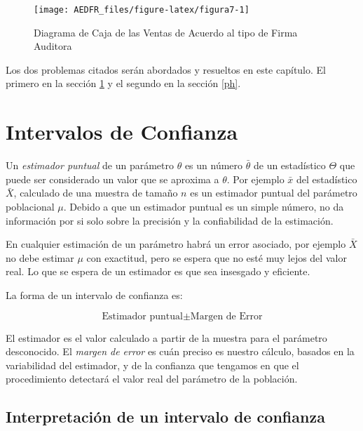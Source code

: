 \documentclass[letterpaper,]{book}
\begin{document}
\begin{figure}[h!]

{\centering \texttt{[image: AEDFR\_files/figure-latex/figura7-1]} 

}

\caption{Diagrama de Caja de las Ventas de Acuerdo al tipo de Firma Auditora}\label{fig:figura7}
\end{figure}

Los dos problemas citados serán abordados y resueltos en este capítulo. El primero en la sección \ref{ic} y el segundo en la sección \ref{ph}.

\hypertarget{ic}{%
\section{Intervalos de Confianza}\label{ic}}

Un \emph{estimador puntual} de un parámetro \(\theta\) es un número \(\bar{\theta}\) de un estadístico \(\Theta\) que puede ser considerado un valor que se aproxima a \(\theta\). Por ejemplo \(\bar{x}\) del estadístico \(\bar{X}\), calculado de una muestra de tamaño \(n\) es un estimador puntual del parámetro poblacional \(\mu\). Debido a que un estimador puntual es un simple número, no da información por si solo sobre la precisión y la confiabilidad de la estimación.

En cualquier estimación de un parámetro habrá un error asociado, por ejemplo \(\bar{X}\) no debe estimar \(\mu\) con exactitud, pero se espera que no esté muy lejos del valor real. Lo que se espera de un estimador es que sea insesgado y eficiente.

La forma de un intervalo de confianza es:

\begin{equation} 
  \text{Estimador puntual} \pm \text{Margen de Error}
  \label{eq:ic}
\end{equation}

El estimador es el valor calculado a partir de la muestra para el parámetro desconocido. El \emph{margen de error} es cuán preciso es nuestro cálculo, basados en la variabilidad del estimador, y de la confianza que tengamos en que el procedimiento detectará el valor real del parámetro de la población.

\hypertarget{interpretacion-de-un-intervalo-de-confianza}{%
\subsection{Interpretación de un intervalo de confianza}\label{interpretacion-de-un-intervalo-de-confianza}}
\end{document}
